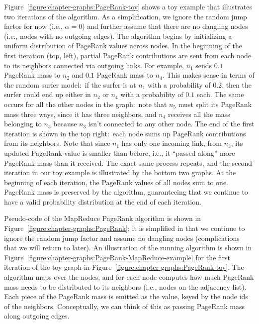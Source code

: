 Figure~\ref{figure:chapter-graphs:PageRank-toy} shows a toy example that
illustrates two iterations of the algorithm.  As a simplification, we
ignore the random jump factor for now (i.e., $\alpha=0$) and further
assume that there are no dangling nodes (i.e., nodes with no outgoing
edges).  The algorithm begins by initializing a uniform distribution
of PageRank values across nodes.  In the beginning of the first
iteration (top, left), partial PageRank contributions are sent from
each node to its neighbors connected via outgoing links.  For example,
$n_1$ sends $0.1$ PageRank mass to $n_2$ and $0.1$ PageRank mass to
$n_4$.  This makes sense in terms of the random surfer model:\ if the
surfer is at $n_1$ with a probability of $0.2$, then the surfer could end up
either in $n_2$ or $n_4$ with a probability of $0.1$ each.  The same
occurs for all the other nodes in the graph:\ note that $n_5$ must
split its PageRank mass three ways, since it has three neighbors, and
$n_4$ receives all the mass belonging to $n_3$ because $n_3$ isn't
connected to any other node.  The end of the first iteration is shown
in the top right:\ each node sums up PageRank contributions from its
neighbors.  Note that since $n_1$ has only one incoming link, from
$n_3$, its updated PageRank value is smaller than before, i.e., it
``passed along'' more PageRank mass than it received.  The exact same
process repeats, and the second iteration in our toy example is
illustrated by the bottom two graphs.  At the beginning of each
iteration, the PageRank values of all nodes sum to one.  PageRank mass
is preserved by the algorithm, guaranteeing that we continue to have a
valid probability distribution at the end of each iteration.

Pseudo-code of the MapReduce PageRank algorithm is shown in
Figure~\ref{figure:chapter-graphs:PageRank}; it is simplified in that we
continue to ignore the random jump factor and assume no dangling nodes
(complications that we will return to later).  An illustration of the
running algorithm is shown in
Figure~\ref{figure:chapter-graphs:PageRank-MapReduce-example} for the first
iteration of the toy graph in
Figure~\ref{figure:chapter-graphs:PageRank-toy}.  The algorithm maps over
the nodes, and for each node computes how much PageRank mass needs to
be distributed to its neighbors (i.e., nodes on the adjacency list).
Each piece of the PageRank mass is emitted as the value, keyed by the node
ids of the neighbors.  Conceptually, we can think of this as passing
PageRank mass along outgoing edges.

